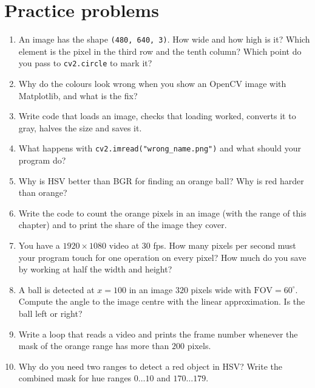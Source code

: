 \section*{Practice problems}
\begin{enumerate}[label=\textbf{\thechapter.\arabic*}]
  \item An image has the shape \texttt{(480, 640, 3)}. How wide and how high is it? Which element is the pixel in the third row and the tenth column? Which point do you pass to \texttt{cv2.circle} to mark it?
  \item Why do the colours look wrong when you show an OpenCV image with Matplotlib, and what is the fix?
  \item Write code that loads an image, checks that loading worked, converts it to gray, halves the size and saves it.
  \item What happens with \texttt{cv2.imread("wrong\_name.png")} and what should your program do?
  \item Why is HSV better than BGR for finding an orange ball? Why is red harder than orange?
  \item Write the code to count the orange pixels in an image (with the range of this chapter) and to print the share of the image they cover.
  \item You have a $1920\times1080$ video at $30$ fps. How many pixels per second must your program touch for one operation on every pixel? How much do you save by working at half the width and height?
  \item A ball is detected at $x=100$ in an image $320$ pixels wide with $\text{FOV}=60^\circ$. Compute the angle to the image centre with the linear approximation. Is the ball left or right?
  \item Write a loop that reads a video and prints the frame number whenever the mask of the orange range has more than $200$ pixels.
  \item[\textbf{\thechapter.10}$\star$] Why do you need two ranges to detect a red object in HSV? Write the combined mask for hue ranges $0\ldots10$ and $170\ldots179$.
\end{enumerate}

